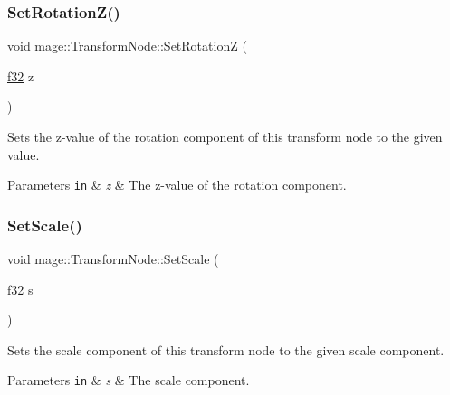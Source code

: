 \subsubsection{\texorpdfstring{Set\+Rotation\+Z()}{SetRotationZ()}}
{\footnotesize\ttfamily void mage\+::\+Transform\+Node\+::\+Set\+RotationZ (\begin{DoxyParamCaption}\item[{\hyperlink{namespacemage_a6a44ad388483959dc4dff9f2aef91431}{f32}}]{z }\end{DoxyParamCaption})\hspace{0.3cm}{\ttfamily [noexcept]}}

Sets the z-\/value of the rotation component of this transform node to the given value.


\begin{DoxyParams}[1]{Parameters}
\mbox{\tt in}  & {\em z} & The z-\/value of the rotation component. \\
\hline
\end{DoxyParams}
\hypertarget{structmage_1_1_transform_node_a225bc04b951eb62e26bc6effc94c4c87}{}\label{structmage_1_1_transform_node_a225bc04b951eb62e26bc6effc94c4c87} 
\subsubsection{\texorpdfstring{Set\+Scale()}{SetScale()}\hspace{0.1cm}{\footnotesize\ttfamily [1/5]}}
{\footnotesize\ttfamily void mage\+::\+Transform\+Node\+::\+Set\+Scale (\begin{DoxyParamCaption}\item[{\hyperlink{namespacemage_a6a44ad388483959dc4dff9f2aef91431}{f32}}]{s }\end{DoxyParamCaption})\hspace{0.3cm}{\ttfamily [noexcept]}}

Sets the scale component of this transform node to the given scale component.


\begin{DoxyParams}[1]{Parameters}
\mbox{\tt in}  & {\em s} & The scale component. \\
\hline
\end{DoxyParams}
\hypertarget{structmage_1_1_transform_node_af1d2daa077dbf9b4bc199387f7df9f14}{}\label{structmage_1_1_transform_node_af1d2daa077dbf9b4bc199387f7df9f14} 
